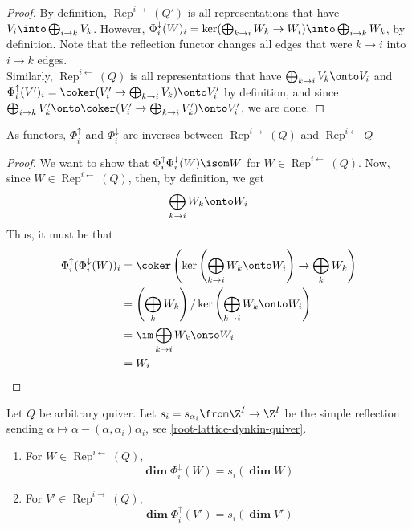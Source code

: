 \documentclass[11pt,leqno,oneside]{amsbook}
\numberwithin{thm}{section}
\newcommand{\Rep}{\operatorname{Rep}} %
\renewcommand{\Q}{Q} %
\newcommand{\grdim}{\boldsymbol{\dim}} %
\newcommand{\sinktosourcefunc}{\Phi^\downarrow} %
\newcommand{\sourcetosinkfunc}{\Phi^\uparrow} %
\begin{document}
\begin{proof}
  By definition, \(\Rep^{i \rightarrow}(Q')\) is all representations
  that have \(V_i \into \bigoplus_{i \to k} V_k\). However,
  \(\sinktosourcefunc_i(W)_i = \ker(\bigoplus_{k \to i}W_k \to W_i)
  \into \bigoplus_{i \to k} W_k\), by definition. Note that the
  reflection functor changes all edges that were \(k \to i\) into \(i
  \to k\) edges. \\

  Similarly, \(\Rep^{i \leftarrow}(Q)\) is all
  representations that have \(\bigoplus_{k \to i} V_k \onto V_i\) and
  \(\sourcetosinkfunc_i(V')_i = \coker(V'_i \to \bigoplus_{k \to i}
  V_k) \onto V'_i\) by definition, and since \(\bigoplus_{i \to k} V'_k
  \onto \coker(V'_i \to \bigoplus_{k \to i} V'_k) \onto V'_i\), we are
  done.
\end{proof}
\begin{prop}\label{equiv-of-cats-source-sink}
  As functors, \(\sourcetosinkfunc_i\) and \(\sinktosourcefunc_i\) are
  inverses between \(\Rep^{i \rightarrow}(\Q)\) and \(\Rep^{i
    \leftarrow} \Q\)
\end{prop}
\begin{proof}
  We want to show that \(\sourcetosinkfunc_i \sinktosourcefunc_i (W) \isom W\)
  for \(W \in \Rep^{i \leftarrow}(\Q)\). Now, since \(W \in \Rep^{i
    \leftarrow}(\Q)\), then, by definition, we get \[
    \bigoplus_{k \to i} W_k \onto W_i
  \]
  Thus, it must be that
  \begin{align*}
    \sourcetosinkfunc_i(\sinktosourcefunc_i(W))_i
    & = \coker\left(\ker \left( \bigoplus_{k \to i} W_k \onto W_i
      \right) \to \bigoplus_k W_k\right) \\ 
    & = \left(\bigoplus_k W_k\right) / \ker \left( \bigoplus_{k \to i}
      W_k \onto W_i \right) \\
    & = \im \bigoplus_{k \to i} W_k \onto W_i \\
    & = W_i
  \end{align*}
\end{proof}
\begin{prop}\label{relate-refl-to-refl-func}
  Let \(\Q\) be arbitrary quiver. Let \(s_i = s_{\alpha_i} \from \Z^I
  \to \Z^I\) be the simple 
  reflection sending \(\alpha \mapsto \alpha - (\alpha, \alpha_i)
  \alpha_i\), see \ref{root-lattice-dynkin-quiver}. 
  \begin{enumerate}
  \item For \(W \in \Rep^{i \leftarrow}(\Q)\), \[
      \grdim \sinktosourcefunc_i(W) = s_i(\grdim W)
    \]
  \item For \(V' \in \Rep^{i \rightarrow}(\Q)\), \[
      \grdim \sourcetosinkfunc_i(V') = s_i(\grdim V')
    \]
  \end{enumerate}
\end{prop}
\end{document}

